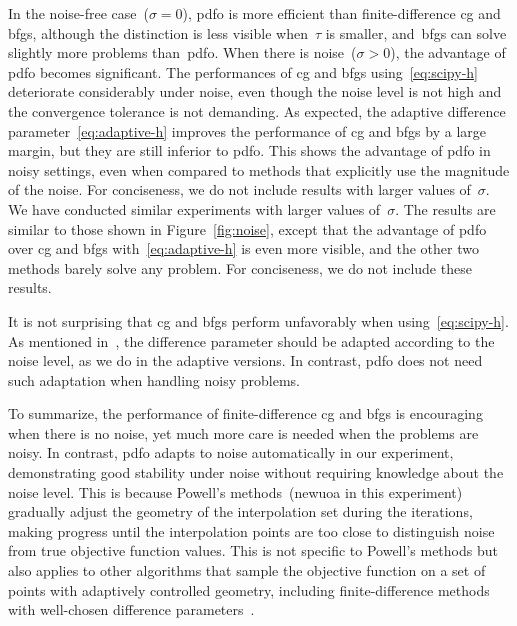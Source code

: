 \documentclass[
    smallextended,  %
    final,          %
]{svjour3}
\newcommand{\modified}[1]{\texorpdfstring{{\color{RoyalBlue}#1}}{#1}}
\begin{document}
In the noise-free case~($\sigma = 0$), \gls{pdfo} is more efficient than finite-difference \gls{cg} and \gls{bfgs}, although the distinction is less visible when~$\tau$ is smaller, and~\gls{bfgs} can solve slightly more problems than~\gls{pdfo}.
When there is noise~($\sigma >0$), the advantage of \gls{pdfo} becomes significant.
The performances of \gls{cg} and \gls{bfgs} \modified{using~\eqref{eq:scipy-h}} deteriorate considerably under noise, even \modified{though} the noise level is not high and the convergence tolerance is not demanding.
\modified{
    As expected, the adaptive difference parameter~\eqref{eq:adaptive-h} improves the performance of \gls{cg} and \gls{bfgs} by a large margin, but they are still inferior to \gls{pdfo}.
    This shows the advantage of \gls{pdfo} in noisy settings, even when compared to methods that explicitly use the magnitude of the noise.
}
\modified{For conciseness,} we do not include results with larger values of~$\sigma$.
\modified{%
    We have conducted similar experiments with larger values of~$\sigma$.
    The results are similar to those shown in Figure~\ref{fig:noise}, except that the advantage of \gls{pdfo} over \gls{cg} and \gls{bfgs} with~\eqref{eq:adaptive-h} is even more visible, and the other two methods barely solve any problem.
    For conciseness, we do not include these results.
}

\modified{
    It is not surprising that \gls{cg} and \gls{bfgs} perform unfavorably when using~\eqref{eq:scipy-h}.
    As mentioned in~\cite{More_Wild_2012,Shi_Etal_2022a,Shi_Etal_2023}, the difference parameter \modified{should} be adapted according to the noise level, as we do in the adaptive versions.
    In contrast, \gls{pdfo} does not need such adaptation when handling noisy problems.
}

To summarize, the performance of finite-difference \gls{cg} and \gls{bfgs} is encouraging when there is no noise, yet much more care is needed when the problems are noisy.
In contrast, \gls{pdfo} adapts to noise automatically in our experiment, demonstrating good stability under noise without requiring knowledge about the noise level.
This is because Powell's methods~(\gls{newuoa} in this experiment) gradually adjust the geometry of the interpolation set during the iterations, making progress until the interpolation points are too close to distinguish noise from true objective function values.
This is not specific to Powell's methods but also applies to other algorithms that sample the objective function on a set of points with adaptively controlled geometry, including finite-difference methods with well-chosen difference parameters~\cite{Shi_Etal_2022a}.
\end{document}
